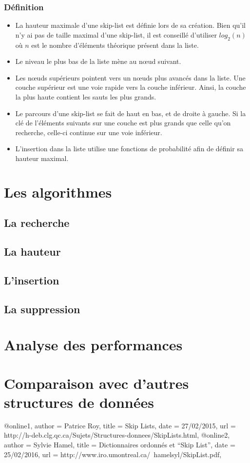 \documentclass[a4paper, 12pt]{article}
\begin{document}
	\subsubsection{Définition}
	\begin{itemize}
		\item La hauteur maximale d'une skip-list est définie lors de sa création. Bien qu'il n'y ai pas de taille maximal d'une skip-list, il est conseillé d'utiliser $log_2(n)$ où $n$ est le nombre d'éléments théorique présent dans la liste. 
		\item Le niveau le plus bas de la liste mène au nœud suivant. 
		\item Les nœuds supérieurs pointent vers un nœuds plus avancés dans la liste.  Une couche supérieur est une voie rapide vers la couche inférieur. Ainsi, la couche la plus haute contient les sauts les plus grands.
		\item Le parcours d'une skip-list se fait de haut en bas, et de droite à gauche. Si la clé de l'éléments suivants sur une couche est plus grands que celle qu'on recherche, celle-ci continue sur une voie inférieur.
		\item L'insertion dans la liste utilise une fonctions de probabilité afin de définir sa hauteur maximal.
	\end{itemize}
	
	\section{Les algorithmes}
	\subsection{La recherche}
	\subsection{La hauteur}
	\subsection{L'insertion}
	\subsection{La suppression}
	
	\section{Analyse des performances}
	\section{Comparaison avec d'autres structures de données}
	
	@online{1,
		author = {Patrice Roy},
		title = {Skip Lists},
		date = {27/02/2015},
		url = {http://h-deb.clg.qc.ca/Sujets/Structures-donnees/SkipLists.html},
	}
	@online{2,
		author = {Sylvie Hamel},
		title = {Dictionnaires ordonnés et “Skip List”},
		date = {25/02/2016},
		url = {http://www.iro.umontreal.ca/~hamelsyl/SkipList.pdf},
	}
	
\end{document}
